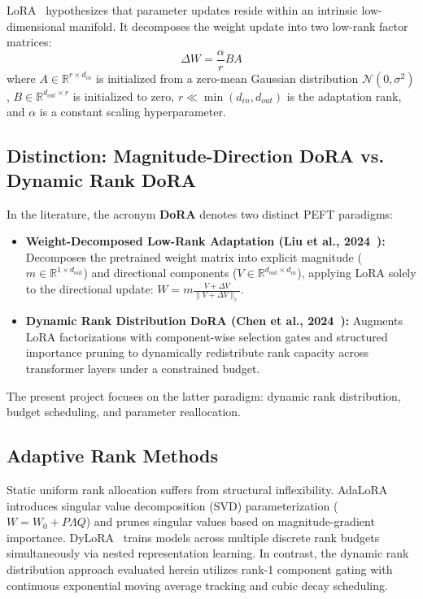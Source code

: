 \documentclass[conference]{IEEEtran}
\begin{document}
LoRA~\cite{hu2022lora} hypothesizes that parameter updates reside within an intrinsic low-dimensional manifold. It decomposes the weight update into two low-rank factor matrices:
\begin{equation}
  \Delta W = \frac{\alpha}{r} B A
  \label{eq:lora}
\end{equation}
where $A \in \mathbb{R}^{r \times d_{in}}$ is initialized from a zero-mean Gaussian distribution $\mathcal{N}(0, \sigma^2)$, $B \in \mathbb{R}^{d_{out} \times r}$ is initialized to zero, $r \ll \min(d_{in}, d_{out})$ is the adaptation rank, and $\alpha$ is a constant scaling hyperparameter.

\subsection{Distinction: Magnitude-Direction DoRA vs. Dynamic Rank DoRA}
In the literature, the acronym \textbf{DoRA} denotes two distinct PEFT paradigms:
\begin{itemize}
  \item \textbf{Weight-Decomposed Low-Rank Adaptation (Liu et al., 2024~\cite{liu2024dora}):} Decomposes the pretrained weight matrix into explicit magnitude ($m \in \mathbb{R}^{1 \times d_{out}}$) and directional components ($V \in \mathbb{R}^{d_{out} \times d_{in}}$), applying LoRA solely to the directional update: $W = m \frac{V + \Delta V}{\|V + \Delta V\|_c}$.
  \item \textbf{Dynamic Rank Distribution DoRA (Chen et al., 2024~\cite{chen2024dora}):} Augments LoRA factorizations with component-wise selection gates and structured importance pruning to dynamically redistribute rank capacity across transformer layers under a constrained budget.
\end{itemize}
The present project focuses on the latter paradigm: dynamic rank distribution, budget scheduling, and parameter reallocation.

\subsection{Adaptive Rank Methods}
Static uniform rank allocation suffers from structural inflexibility. AdaLoRA~\cite{zhang2023adalora} introduces singular value decomposition (SVD) parameterization ($W = W_0 + P \Lambda Q$) and prunes singular values based on magnitude-gradient importance. DyLoRA~\cite{valipour2023dylora} trains models across multiple discrete rank budgets simultaneously via nested representation learning. In contrast, the dynamic rank distribution approach evaluated herein utilizes rank-1 component gating with continuous exponential moving average tracking and cubic decay scheduling.
\end{document}
